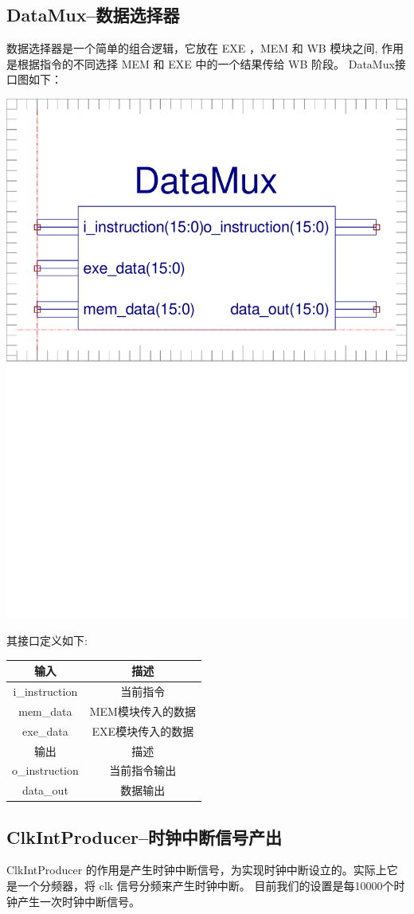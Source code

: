 \documentclass[10pt]{article}
\begin{document}
\begin{CJK}{UTF8}{gbsn}
\subsection{DataMux--数据选择器}
数据选择器是一个简单的组合逻辑，它放在 EXE ，MEM 和 WB 模块之间, 作用是根据指令的不同选择 MEM 和 EXE 中的一个结果传给 WB 阶段。
DataMux接口图如下：\\
\begin{center}
\includegraphics[width=0.5\linewidth,trim=0mm 5cm 0mm 0mm]{datamux.pdf}
\end{center}

其接口定义如下:\\
\begin{center}
\begin{tabular}{|c|c|}\hline
输入&描述\\\hline
i\_instruction&当前指令\\\hline
mem\_data&MEM模块传入的数据\\\hline
exe\_data&EXE模块传入的数据\\\hline\hline
输出&描述\\\hline
o\_instruction&当前指令输出\\\hline
data\_out&数据输出\\\hline
\end{tabular}
\end{center}

\subsection{ClkIntProducer--时钟中断信号产出}
ClkIntProducer 的作用是产生时钟中断信号，为实现时钟中断设立的。实际上它是一个分频器，将 clk 信号分频来产生时钟中断。
目前我们的设置是每10000个时钟产生一次时钟中断信号。


\end{CJK}
\end{document}
